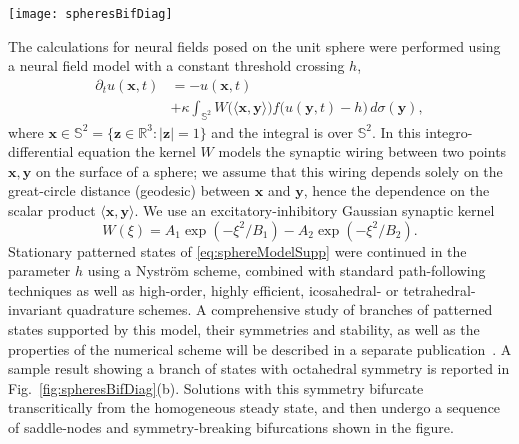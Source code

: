 \documentclass[aps,prl,reprint,superscriptaddress]{revtex4-1}
\newcommand{\RSet}{\mathbb{R}}
\newcommand{\sph}{\mathbb{S}^2}
\newcommand{\vect}[1]{\ensuremath{\bm #1}}
\newcommand{\DA}[1]{\textcolor{blue!80!white}{\texttt{DA}: #1}}
\newcommand{\edits}[1]{#1}
\begin{document}
\begin{figure*}
  \texttt{[image: spheresBifDiag]}
  \caption{Spatio-temporal canards of folded-saddle type occurring in a neural field model
    posed on a spherical domain using $h$ as the continuation parameter. (b) Bifurcation diagram of steady states with
    octahedral symmetry in the system~\eqref{eq:sphereModelSupp}.
    (a,c) Bifurcation diagram (red), orbit (blue) and representative patterns
    obtained when $h$ varies slowly through (a) a low-lying fold, and (c) one of the
    higher folds.  When the evolution of $h$ is decoupled from $u$, we observe spatio-temporal
    canards of folded-saddle type (see the animations
    \href{run:anc/canardCycle.mp4}{canardCycle.mp4},
    \href{run:anc/canardDown.mp4}{canardDown.mp4}, 
    \href{run:anc/canardUp.mp4}{canardUp.mp4} for further details).
    }
  \label{fig:spheresBifDiag}
\end{figure*}
The calculations for neural fields posed on the unit sphere
were performed using a neural field model with a constant threshold crossing $h$,
\begin{align} \label{eq:sphereModelSupp}
  \partial_t u(\vect{x},t) &= -u(\vect{x},t)\\
\nonumber  &+ \kappa \int_{\sph} W\big( \langle \vect{x},\vect{y} \rangle \big) f\big(
  u(\vect{y},t) - h\big) \, d\sigma(\vect{y}), 
\end{align}
where $\vect{x} \in \sph = \{ \vect{z} \in \RSet^3 \colon |
\vect{z} | = 1 \}$ and the integral is over $\sph$.
In this integro-differential equation the kernel $W$ models the synaptic wiring
between two points $\vect{x}, \vect{y}$ on the surface of a sphere;
we assume that this wiring depends solely on the great-circle distance (geodesic)
between $\vect{x}$ and $\vect{y}$, hence the dependence on the scalar product $\langle
\vect{x},\vect{y} \rangle$. We use an excitatory-inhibitory Gaussian synaptic kernel
\begin{equation}\label{eq:sphereKernel}
W(\xi) = A_1 \exp(-\xi^2 /B_1) - A_2 \exp(-\xi^2 /B_2).
\end{equation}
Stationary patterned states of \eqref{eq:sphereModelSupp} were continued in the parameter
$h$ using a Nystr\"om scheme, combined with standard path-following techniques \edits{as well as} 
high-order, highly efficient, icosahedral- or tetrahedral-invariant quadrature schemes.
A comprehensive study of branches of patterned states supported by this model, their
symmetries and stability, as well as the properties of the numerical scheme will be
described in a separate publication~\cite{Avitabile:2016}. A sample result showing
a branch of states with octahedral symmetry
 is reported in Fig.~\ref{fig:spheresBifDiag}(b). Solutions with
this symmetry bifurcate transcritically from the homogeneous steady state, and then
undergo a sequence of saddle-nodes and symmetry-breaking bifurcations shown in the figure.
\end{document}
